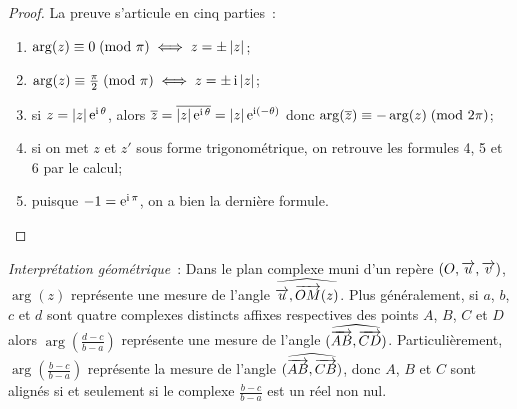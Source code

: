 \begin{proof}
    La preuve s'articule en cinq parties~:
    \begin{enumerate}
        \item \(\arg(z) \equiv 0\!\pmod {\pi} \iff z = \pm \left\lvert z\right\rvert\);
        \item \(\arg(z) \equiv \frac{\pi}{2}\!\pmod {\pi} \iff z = \pm \operatorname{i} \left\lvert z\right\rvert\);
        \item si \(z = \left\lvert z\right\rvert \operatorname{e}^{\operatorname{i} \theta}\), alors 
            \(\overline{z} = \overline{|z| \operatorname{e}^{\operatorname{i} \theta}} = |z| \operatorname{e}^{\operatorname{i} (-\theta)}\) donc 
            \(\arg(\overline{z}) \equiv -\arg(z)\!\pmod {2\pi}\);
        \item si on met \(z\) et \(z'\) sous forme trigonométrique, on retrouve les formules 4, 5 et 6 par le calcul;
        \item puisque \(-1 = \operatorname{e}^{\operatorname{i} \pi}\), on a bien la dernière formule.
    \end{enumerate}
\end{proof}
\emph{Interprétation géométrique}~: Dans le plan complexe muni d'un repère 
\((O,\overrightarrow{u}, \overrightarrow{v})\), \(\arg(z)\) représente une mesure de l'angle 
\(\widehat{\overrightarrow{u}, \overrightarrow{OM}(z)}\). Plus généralement, si \(a\), \(b\), \(c\) 
et \(d\) sont quatre complexes distincts affixes respectives des points \(A\), 
\(B\), \(C\) et \(D\) alors \(\arg\left(\frac{d-c}{b-a}\right)\) représente une 
mesure de l'angle \((\widehat{\overrightarrow{AB},\overrightarrow{CD}})\). Particulièrement, 
\(\arg\left(\frac{b-c}{b-a}\right)\) représente la mesure de l'angle 
\((\widehat{\overrightarrow{AB},\overrightarrow{CB}})\), donc \(A\), \(B\) et \(C\) sont alignés si 
et seulement si le complexe \(\frac{b-c}{b-a}\) est un réel non nul.
